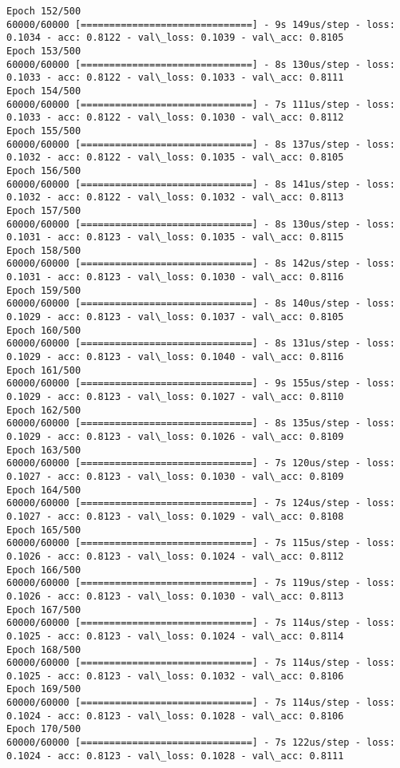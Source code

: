 \documentclass[11pt]{article}
\begin{document}
\begin{Verbatim}[commandchars=\\\{\}]
Epoch 152/500
60000/60000 [==============================] - 9s 149us/step - loss: 0.1034 - acc: 0.8122 - val\_loss: 0.1039 - val\_acc: 0.8105
Epoch 153/500
60000/60000 [==============================] - 8s 130us/step - loss: 0.1033 - acc: 0.8122 - val\_loss: 0.1033 - val\_acc: 0.8111
Epoch 154/500
60000/60000 [==============================] - 7s 111us/step - loss: 0.1033 - acc: 0.8122 - val\_loss: 0.1030 - val\_acc: 0.8112
Epoch 155/500
60000/60000 [==============================] - 8s 137us/step - loss: 0.1032 - acc: 0.8122 - val\_loss: 0.1035 - val\_acc: 0.8105
Epoch 156/500
60000/60000 [==============================] - 8s 141us/step - loss: 0.1032 - acc: 0.8122 - val\_loss: 0.1032 - val\_acc: 0.8113
Epoch 157/500
60000/60000 [==============================] - 8s 130us/step - loss: 0.1031 - acc: 0.8123 - val\_loss: 0.1035 - val\_acc: 0.8115
Epoch 158/500
60000/60000 [==============================] - 8s 142us/step - loss: 0.1031 - acc: 0.8123 - val\_loss: 0.1030 - val\_acc: 0.8116
Epoch 159/500
60000/60000 [==============================] - 8s 140us/step - loss: 0.1029 - acc: 0.8123 - val\_loss: 0.1037 - val\_acc: 0.8105
Epoch 160/500
60000/60000 [==============================] - 8s 131us/step - loss: 0.1029 - acc: 0.8123 - val\_loss: 0.1040 - val\_acc: 0.8116
Epoch 161/500
60000/60000 [==============================] - 9s 155us/step - loss: 0.1029 - acc: 0.8123 - val\_loss: 0.1027 - val\_acc: 0.8110
Epoch 162/500
60000/60000 [==============================] - 8s 135us/step - loss: 0.1029 - acc: 0.8123 - val\_loss: 0.1026 - val\_acc: 0.8109
Epoch 163/500
60000/60000 [==============================] - 7s 120us/step - loss: 0.1027 - acc: 0.8123 - val\_loss: 0.1030 - val\_acc: 0.8109
Epoch 164/500
60000/60000 [==============================] - 7s 124us/step - loss: 0.1027 - acc: 0.8123 - val\_loss: 0.1029 - val\_acc: 0.8108
Epoch 165/500
60000/60000 [==============================] - 7s 115us/step - loss: 0.1026 - acc: 0.8123 - val\_loss: 0.1024 - val\_acc: 0.8112
Epoch 166/500
60000/60000 [==============================] - 7s 119us/step - loss: 0.1026 - acc: 0.8123 - val\_loss: 0.1030 - val\_acc: 0.8113
Epoch 167/500
60000/60000 [==============================] - 7s 114us/step - loss: 0.1025 - acc: 0.8123 - val\_loss: 0.1024 - val\_acc: 0.8114
Epoch 168/500
60000/60000 [==============================] - 7s 114us/step - loss: 0.1025 - acc: 0.8123 - val\_loss: 0.1032 - val\_acc: 0.8106
Epoch 169/500
60000/60000 [==============================] - 7s 114us/step - loss: 0.1024 - acc: 0.8123 - val\_loss: 0.1028 - val\_acc: 0.8106
Epoch 170/500
60000/60000 [==============================] - 7s 122us/step - loss: 0.1024 - acc: 0.8123 - val\_loss: 0.1028 - val\_acc: 0.8111

\end{Verbatim}
\end{document}
